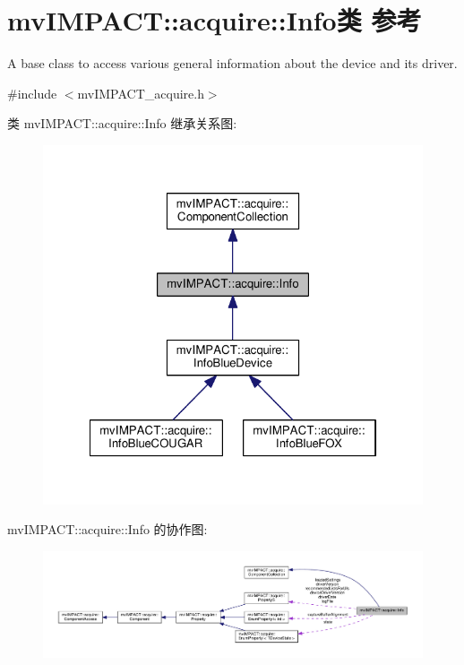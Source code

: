 \hypertarget{classmv_i_m_p_a_c_t_1_1acquire_1_1_info}{\section{mv\+I\+M\+P\+A\+C\+T\+:\+:acquire\+:\+:Info类 参考}
\label{classmv_i_m_p_a_c_t_1_1acquire_1_1_info}
}


A base class to access various general information about the device and its driver.  




{\ttfamily \#include $<$mv\+I\+M\+P\+A\+C\+T\+\_\+acquire.\+h$>$}



类 mv\+I\+M\+P\+A\+C\+T\+:\+:acquire\+:\+:Info 继承关系图\+:
\nopagebreak
\begin{figure}[H]
\begin{center}
\leavevmode
\includegraphics[width=322pt]{classmv_i_m_p_a_c_t_1_1acquire_1_1_info__inherit__graph}
\end{center}
\end{figure}


mv\+I\+M\+P\+A\+C\+T\+:\+:acquire\+:\+:Info 的协作图\+:
\nopagebreak
\begin{figure}[H]
\begin{center}
\leavevmode
\includegraphics[width=350pt]{classmv_i_m_p_a_c_t_1_1acquire_1_1_info__coll__graph}
\end{center}
\end{figure}
